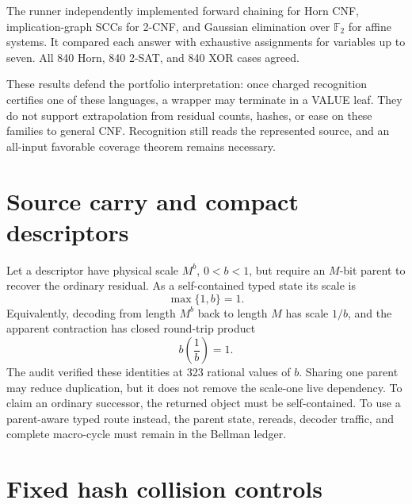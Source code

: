 \documentclass[11pt]{article}
\begin{document}
The runner independently implemented forward chaining for Horn CNF,
implication-graph SCCs for 2-CNF, and Gaussian elimination over $\mathbb F_2$
for affine systems.  It compared each answer with exhaustive assignments for
variables up to seven.  All 840 Horn, 840 2-SAT, and 840 XOR cases agreed.

These results defend the portfolio interpretation: once charged recognition
certifies one of these languages, a wrapper may terminate in a VALUE leaf.
They do not support extrapolation from residual counts, hashes, or ease on
these families to general CNF.  Recognition still reads the represented
source, and an all-input favorable coverage theorem remains necessary.

\section{Source carry and compact descriptors}

Let a descriptor have physical scale $M^b$, $0<b<1$, but require an $M$-bit
parent to recover the ordinary residual.  As a self-contained typed state its
scale is
\[
       \max\{1,b\}=1.
\]
Equivalently, decoding from length $M^b$ back to length $M$ has scale $1/b$,
and the apparent contraction has closed round-trip product
\[
       b\left(\frac1b\right)=1.
\]
The audit verified these identities at 323 rational values of $b$.  Sharing
one parent may reduce duplication, but it does not remove the scale-one live
dependency.  To claim an ordinary successor, the returned object must be
self-contained.  To use a parent-aware typed route instead, the parent state,
rereads, decoder traffic, and complete macro-cycle must remain in the Bellman
ledger.

\section{Fixed hash collision controls}
\end{document}
